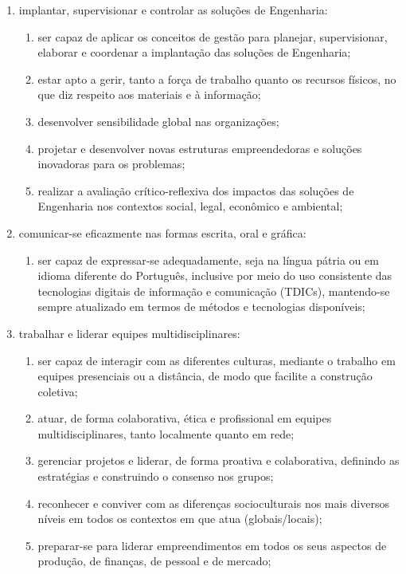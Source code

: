 \begin{citacao}
\begin{enumerate}
        \item implantar, supervisionar e controlar as soluções de Engenharia:
        \begin{enumerate}
            \item ser capaz de aplicar os conceitos de gestão para planejar, supervisionar, elaborar e coordenar a implantação das soluções de Engenharia;
            \item estar apto a gerir, tanto a força de trabalho quanto os recursos físicos, no que diz respeito aos materiais e à informação;
            \item desenvolver sensibilidade global nas organizações;
            \item projetar e desenvolver novas estruturas empreendedoras e soluções inovadoras para os problemas;
            \item realizar a avaliação crítico-reflexiva dos impactos das soluções de Engenharia nos contextos social, legal, econômico e ambiental;
        \end{enumerate}

        \item comunicar-se eficazmente nas formas escrita, oral e gráfica:
        \begin{enumerate}
            \item ser capaz de expressar-se adequadamente, seja na língua pátria ou em idioma diferente do Português, inclusive por meio do uso consistente das tecnologias digitais de informação e comunicação (TDICs), mantendo-se sempre atualizado em termos de métodos e tecnologias disponíveis;
        \end{enumerate}

        \item trabalhar e liderar equipes multidisciplinares: 
        \begin{enumerate}
            \item ser capaz de interagir com as diferentes culturas, mediante o trabalho em equipes presenciais ou a distância, de modo que facilite a construção coletiva;
            \item atuar, de forma colaborativa, ética e profissional em equipes multidisciplinares, tanto localmente quanto em rede;
            \item gerenciar projetos e liderar, de forma proativa e colaborativa, definindo as estratégias e construindo o consenso nos grupos;
            \item reconhecer e conviver com as diferenças socioculturais nos mais diversos níveis em todos os contextos em que atua (globais/locais);
            \item preparar-se para liderar empreendimentos em todos os seus aspectos de produção, de finanças, de pessoal e de mercado;
        \end{enumerate}


\end{enumerate}
\end{citacao}
